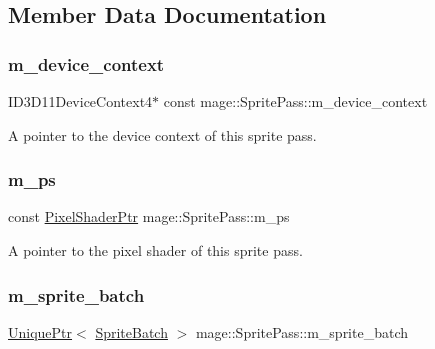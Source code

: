 \subsection{Member Data Documentation}
\hypertarget{classmage_1_1_sprite_pass_aee6b9924a954629c19385c70ecf91d0a}{}\label{classmage_1_1_sprite_pass_aee6b9924a954629c19385c70ecf91d0a} 
\subsubsection{\texorpdfstring{m\+\_\+device\+\_\+context}{m\_device\_context}}
{\footnotesize\ttfamily I\+D3\+D11\+Device\+Context4$\ast$ const mage\+::\+Sprite\+Pass\+::m\+\_\+device\+\_\+context\hspace{0.3cm}{\ttfamily [private]}}

A pointer to the device context of this sprite pass. \hypertarget{classmage_1_1_sprite_pass_ac9161d187ea23dd5f8c2ec5de34a6c0b}{}\label{classmage_1_1_sprite_pass_ac9161d187ea23dd5f8c2ec5de34a6c0b} 
\subsubsection{\texorpdfstring{m\+\_\+ps}{m\_ps}}
{\footnotesize\ttfamily const \hyperlink{namespacemage_acbec875bb5e5e085e32ed244a24d2b6f}{Pixel\+Shader\+Ptr} mage\+::\+Sprite\+Pass\+::m\+\_\+ps\hspace{0.3cm}{\ttfamily [private]}}

A pointer to the pixel shader of this sprite pass. \hypertarget{classmage_1_1_sprite_pass_a9083152ae0681429df4dd0fce533f7dc}{}\label{classmage_1_1_sprite_pass_a9083152ae0681429df4dd0fce533f7dc} 
\subsubsection{\texorpdfstring{m\+\_\+sprite\+\_\+batch}{m\_sprite\_batch}}
{\footnotesize\ttfamily \hyperlink{namespacemage_a3316d7143a973e37adf1110f2e80ca31}{Unique\+Ptr}$<$ \hyperlink{classmage_1_1_sprite_batch}{Sprite\+Batch} $>$ mage\+::\+Sprite\+Pass\+::m\+\_\+sprite\+\_\+batch\hspace{0.3cm}{\ttfamily [private]}}


